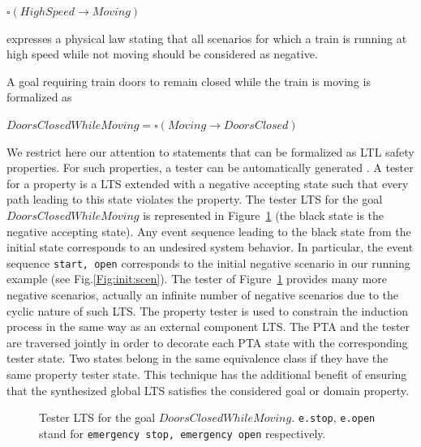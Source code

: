 \begin{center}
	$\square (HighSpeed \rightarrow Moving)$
\end{center}

expresses a physical law stating that all scenarios for which a train is running at high speed while not moving should be considered as negative. 

A goal requiring train doors to remain closed while the train is moving is formalized as 
\begin{center}
$ DoorsClosedWhileMoving = \square (Moving \rightarrow DoorsClosed)$
\end{center}

We restrict here our attention to statements that can be formalized as LTL safety properties. For such properties, a tester can be automatically generated \cite{Giannakopoulou:2003}. A tester for a property is a LTS extended with a negative accepting state such that every path leading to this state violates the property. The tester LTS for the goal $DoorsClosedWhileMoving$ is represented in Figure~\ref{Fig:Goals:Injection} (the black state is the negative accepting state). Any event sequence leading to the black state from the initial state corresponds to an undesired system behavior. In particular, the event sequence \texttt{start, open} corresponds to the initial negative scenario in our running example (see Fig.\ref{Fig:init:scen}). The tester of Figure~\ref{Fig:Goals:Injection} provides many more negative scenarios, actually an infinite number of negative scenarios due to the cyclic nature of such LTS. The property tester is used to constrain the induction process in the same way as an external component LTS. The PTA and the tester are traversed jointly in order to decorate each PTA state with the corresponding tester state. Two states belong in the same equivalence class if they have the same property tester state. This technique has the additional benefit of ensuring that the synthesized global LTS satisfies the considered goal or domain property. 

\begin{figure}[H]
\centering
{}
\caption{Tester LTS for the goal $DoorsClosedWhileMoving$\label{Fig:Goals:Injection}. {\small \texttt{e.stop}, \texttt{e.open} stand for \texttt{emergency stop, emergency open} respectively}.}
\end{figure}
